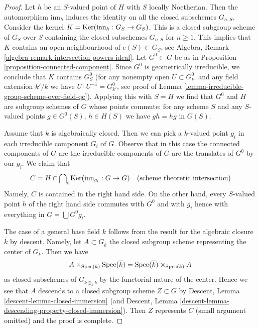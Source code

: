 \begin{proof}
\medskip\noindent
Let $h$ be an $S$-valued point of $H$ with $S$ locally Noetherian.
Then the automorphism $\text{inn}_h$ induces the identity on all
the closed subschemes $G_{n, S}$. Consider the kernel
$K = \mathop{\mathrm{Ker}}(\text{inn}_h : G_S \to G_S)$.
This is a closed subgroup scheme of $G_S$ over $S$ containing the
closed subschemes $G_{n, S}$ for $n \geq 1$.
This implies that $K$ contains an open neighbourhood of
$e(S) \subset G_S$, see
Algebra, Remark \ref{algebra-remark-intersection-powers-ideal}.
Let $G^0 \subset G$ be as in Proposition \ref{proposition-connected-component}.
Since $G^0$ is geometrically irreducible, we conclude that $K$ contains
$G^0_S$ (for any nonempty open $U \subset G^0_{k'}$ and any field extension
$k'/k$ we have $U \cdot U^{-1} = G^0_{k'}$, see proof of
Lemma \ref{lemma-irreducible-group-scheme-over-field-qc}).
Applying this with $S = H$ we find that $G^0$ and $H$
are subgroup schemes of $G$ whose points commute: for any scheme $S$
and any $S$-valued points $g \in G^0(S)$, $h \in H(S)$ we have
$gh = hg$ in $G(S)$.

\medskip\noindent
Assume that $k$ is algebraically closed. Then we can pick a $k$-valued
point $g_i$ in each irreducible component $G_i$ of $G$. Observe that in
this case the connected components of $G$ are the irreducible components
of $G$ are the translates of $G^0$ by our $g_i$. We claim that
$$
C = H \cap \bigcap\nolimits_i \mathop{\mathrm{Ker}}(\text{inn}_{g_i} : G \to G)
\quad (\text{scheme theoretic intersection})
$$
Namely, $C$ is contained in the right hand side. On the other hand, every
$S$-valued point $h$ of the right hand side commutes with $G^0$
and with $g_i$ hence with everything in $G = \bigcup G^0g_i$.

\medskip\noindent
The case of a general base field $k$ follows from the result for the
algebraic closure $\overline{k}$ by descent. Namely, let
$A \subset G_{\overline{k}}$ the closed subgroup scheme representing
the center of $G_{\overline{k}}$. Then we have
$$
A \times_{\mathop{\mathrm{Spec}}(k)} \mathop{\mathrm{Spec}}(\overline{k}) =
\mathop{\mathrm{Spec}}(\overline{k}) \times_{\mathop{\mathrm{Spec}}(k)} A
$$
as closed subschemes of $G_{\overline{k} \otimes_k \overline{k}}$ by
the functorial nature of the center. Hence we see that $A$ descends
to a closed subgroup scheme $Z \subset G$ by
Descent, Lemma \ref{descent-lemma-closed-immersion}
(and Descent, Lemma \ref{descent-lemma-descending-property-closed-immersion}).
Then $Z$ represents $C$ (small argument omitted) and the proof is complete.
\end{proof}







